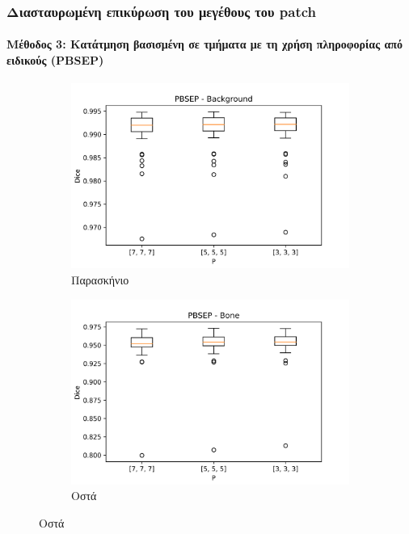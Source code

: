 \documentclass{beamer}
\begin{document}
\begin{frame}
\frametitle{Διασταυρωμένη επικύρωση του μεγέθους του patch}
\framesubtitle{Μέθοδος 3: Κατάτμηση βασισμένη σε τμήματα με τη χρήση πληροφορίας
από ειδικούς (PBSEP)}

\begin{figure}[H]
    \centering

    \begin{subfigure}[b]{0.42\linewidth}
    \includegraphics[width=\linewidth]{PBSEP_P_Background_plot.png}
    \caption{Παρασκήνιο}
    \end{subfigure}
    \begin{subfigure}[b]{0.42\linewidth}
    \includegraphics[width=\linewidth]{PBSEP_P_Bone_plot.png}
    \caption{Οστά}
    \end{subfigure}


\end{figure}
\end{frame}
\end{document}
